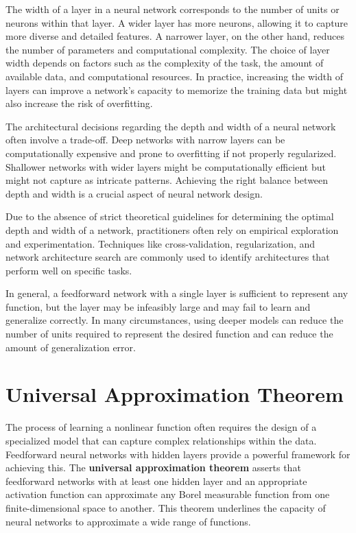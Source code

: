 \documentclass{report}
\begin{document}
The width of a layer in a neural network corresponds to the number of units or neurons within that layer. A wider layer has more neurons, allowing it to capture more diverse and detailed features. A narrower layer, on the other hand, reduces the number of parameters and computational complexity. The choice of layer width depends on factors such as the complexity of the task, the amount of available data, and computational resources. In practice, increasing the width of layers can improve a network's capacity to memorize the training data but might also increase the risk of overfitting.

The architectural decisions regarding the depth and width of a neural network often involve a trade-off. Deep networks with narrow layers can be computationally expensive and prone to overfitting if not properly regularized. Shallower networks with wider layers might be computationally efficient but might not capture as intricate patterns. Achieving the right balance between depth and width is a crucial aspect of neural network design.

Due to the absence of strict theoretical guidelines for determining the optimal depth and width of a network, practitioners often rely on empirical exploration and experimentation. Techniques like cross-validation, regularization, and network architecture search are commonly used to identify architectures that perform well on specific tasks.

In general, a feedforward network with a single layer is sufficient to represent any function, but the layer may be infeasibly large and may fail to learn and generalize correctly. 
In many circumstances, using deeper models can reduce the number of units required to represent the desired function and can reduce the amount of generalization error.

\section{Universal Approximation Theorem}

The process of learning a nonlinear function often requires the design of a specialized model that can capture complex relationships within the data. Feedforward neural networks with hidden layers provide a powerful framework for achieving this. The \textbf{universal approximation theorem} asserts that feedforward networks with at least one hidden layer and an appropriate activation function can approximate any Borel measurable function from one finite-dimensional space to another. This theorem underlines the capacity of neural networks to approximate a wide range of functions.
\end{document}
